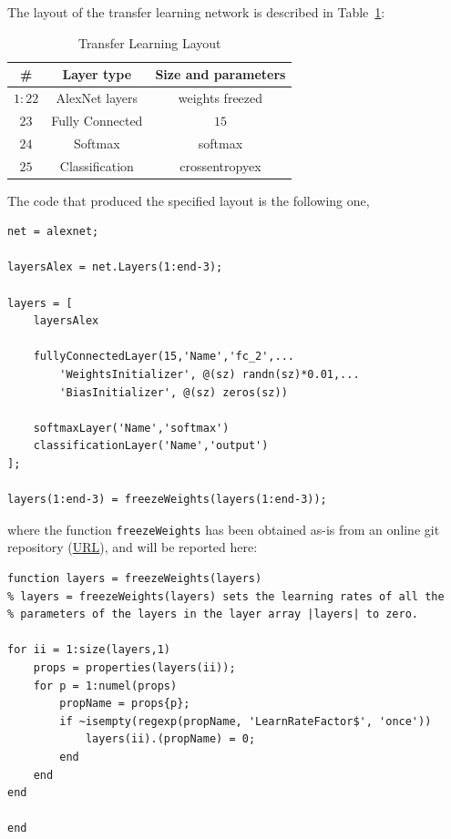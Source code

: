 \documentclass[a4paper, 11pt]{article} %
\begin{document}
The layout of the transfer learning network is described in Table~\ref{tab:transfer-learning-layout-1}:

\bigskip
\begin{table}[ht]
\centering
\begin{tabular}{|c|c|c|}
\hline 
\textbf{\#} & \textbf{Layer type} & \textbf{Size and parameters} \\
\hline \hline 
$1:22$ & AlexNet layers & weights freezed \\
\hline 
$23$ & Fully Connected & $15$ \\
\hline
$24$ & Softmax & softmax \\ 
\hline 
$25$ & Classification & crossentropyex \\
\hline
\end{tabular}
\caption{Transfer Learning Layout}\label{tab:transfer-learning-layout-1}
\end{table}
\bigskip

The code that produced the specified layout is the following one,

\begin{lstlisting}
net = alexnet;

layersAlex = net.Layers(1:end-3);

layers = [
    layersAlex

    fullyConnectedLayer(15,'Name','fc_2',...
        'WeightsInitializer', @(sz) randn(sz)*0.01,...
        'BiasInitializer', @(sz) zeros(sz))

    softmaxLayer('Name','softmax')
    classificationLayer('Name','output')
];

layers(1:end-3) = freezeWeights(layers(1:end-3));
\end{lstlisting}

where the function \texttt{freezeWeights} has been obtained as-is from an online git repository (\href{https://github.com/GRSEB9S/Transfer-Learning-using-Matlab/blob/master/TransferLearningUsingResNet101Example/freezeWeights.m}{URL}), and will be reported here:

\begin{lstlisting}
function layers = freezeWeights(layers)
% layers = freezeWeights(layers) sets the learning rates of all the
% parameters of the layers in the layer array |layers| to zero.

for ii = 1:size(layers,1)
    props = properties(layers(ii));
    for p = 1:numel(props)
        propName = props{p};
        if ~isempty(regexp(propName, 'LearnRateFactor$', 'once'))
            layers(ii).(propName) = 0;
        end
    end
end

end
\end{lstlisting}
\end{document}
